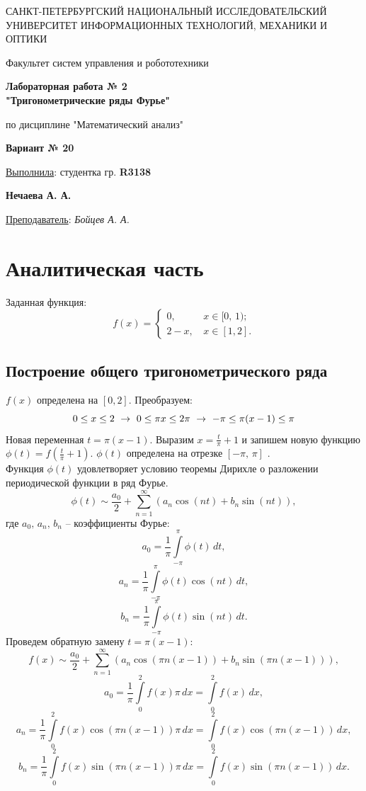 \documentclass[a5paper, 10pt]{article}
\theoremstyle{definition}
\theoremstyle{plain}
\theoremstyle{remark}
\newcommand*{\titlePage}{
	\thispagestyle{title}
	\begingroup
	\begin{center}
		\vspace*{6ex}
		
		{\small
			САНКТ-ПЕТЕРБУРГСКИЙ НАЦИОНАЛЬНЫЙ ИССЛЕДОВАТЕЛЬСКИЙ УНИВЕРСИТЕТ ИНФОРМАЦИОННЫХ ТЕХНОЛОГИЙ, МЕХАНИКИ И ОПТИКИ	
		}
		
		\vspace*{2ex}
		
		{\normalsize
			Факультет систем управления и робототехники
		}
		
		\vspace*{15ex}
		
		{\Large \bfseries 
			Лабораторная работа № 2\\
"Тригонометрические ряды Фурье"
		}
\vspace*{2ex}
		
		{\normalsize
			по дисциплине "Математический анализ"
		}

                    \vspace*{2ex}

                    { \bfseries 
			Вариант № 20
		}
	\end{center}
	\vspace*{20ex}
	\begin{flushright}
		{\large 
			\underline{Выполнила}: студентка гр. \textbf{R3138}\\
			\begin{flushright}
				\textbf{Нечаева А. А.}\\
			\end{flushright}
		}
		
		\vspace*{5ex}
		
		{\large 
			\underline{Преподаватель}: \textit{Бойцев А. А.}
		}
	\end{flushright}	
	\newpage
	\setcounter{page}{2}
	\endgroup}
\begin{document}
	\titlePage
	\pagestyle{style}
\newpage

\section{Аналитическая часть}
Заданная функция:
\begin{equation}
f(x) = 
\begin{cases}
0, \, & x \in [0, \, 1);\\
2 - x, \, & x \in [1, 2].
\end{cases}
\end{equation}


\subsection{Построение общего тригонометрического ряда}	
$f(x)$ определена на $[0, 2]$. Преобразуем:
\begin{equation*}
0 \leq x \leq 2  \, \, \to \, \,
0 \leq \pi x \leq 2 \pi \, \, \to \, \,
-\pi \leq \pi(x-1) \leq \pi\\
\end{equation*}
Новая переменная $t =\pi(x-1)$. Выразим $x = \frac{t}{\pi} + 1$ и запишем новую функцию $\phi (t) = f( \frac{t}{\pi} + 1)$. $\phi (t)$ определена на отрезке $[-\pi, \, \pi]$ .\\
Функция $\phi (t)$ удовлетворяет условию теоремы Дирихле о разложении периодической функции в ряд Фурье.
\begin{equation*}
\phi (t) \sim  \frac{a_0}{2} + \sum \limits_{n = 1}^{\infty} \left( a_n \cos(nt) + b_n \sin(nt) \right), 
\end{equation*}
где $a_0, \, a_n, \, b_n$ -- коэффициенты Фурье:\\
\begin{equation*}
a_0 = \frac{1}{\pi} \int \limits_{-\pi}^{\pi} \phi(t) \, dt,
\end{equation*}
\begin{equation*}
a_n = \frac{1}{\pi} \int \limits_{-\pi}^{\pi} \phi(t) \cos(nt) \, dt,
\end{equation*}
\begin{equation*}
b_n = \frac{1}{\pi} \int \limits_{-\pi}^{\pi} \phi(t) \sin(nt) \, dt.
\end{equation*}
Проведем обратную замену $t =\pi(x-1)$:
\begin{equation*}
f (x) \sim  \frac{a_0}{2} + \sum \limits_{n = 1}^{\infty} \left( a_n \cos(\pi n(x-1)) + b_n \sin(\pi n(x-1)) \right),
\end{equation*}
\begin{equation*}
a_0 = \frac{1}{\pi} \int \limits_{0}^{2} f(x) \pi \, dx = \int \limits_{0}^{2} f(x) \, dx, 
\end{equation*}
\begin{equation*}
a_n = \frac{1}{\pi} \int \limits_{0}^{2} f(x) \cos(\pi n(x-1))  \pi \, dx = \int \limits_{0}^{2} f(x) \cos(\pi n(x-1)) \, dx ,
\end{equation*}
\begin{equation*}
b_n = \frac{1}{\pi} \int \limits_{0}^{2} f(x) \sin(\pi n(x-1)) \pi \, dx = \int \limits_{0}^{2} f(x) \sin(\pi n(x-1)) \, dx .
\end{equation*}
\end{document}
